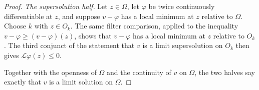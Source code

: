 \begin{proof}
\emph{The supersolution half.}
Let $z\in\Omega$, let $\varphi$ be twice continuously differentiable at $z$, and
suppose $v-\varphi$ has a local minimum at $z$ relative to $\Omega$. Choose $k$
with $z\in O_k$. The same filter comparison, applied to the inequality
$v-\varphi\ge(v-\varphi)(z)$, shows that $v-\varphi$ has a local minimum at $z$
relative to $O_k$. The third conjunct of the statement that $v$ is a limit
supersolution on $O_k$ then gives $\mathcal L\varphi(z)\le0$.

Together with the openness of $\Omega$ and the continuity of $v$ on $\Omega$,
the two halves say exactly that $v$ is a limit solution on $\Omega$.
\end{proof}

